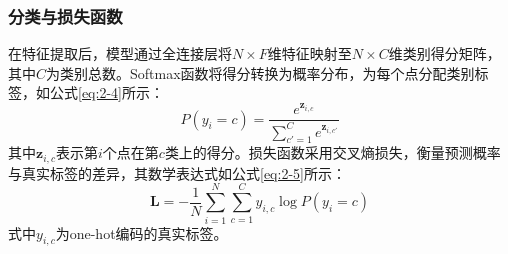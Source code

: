 \subsubsection{分类与损失函数}
在特征提取后，模型通过全连接层将$N \times F$维特征映射至$N \times C$维类别得分矩阵，其中$C$为类别总数。Softmax函数将得分转换为概率分布，为每个点分配类别标签，如公式\eqref{eq:2-4}所示：
\begin{equation}
    \label{eq:2-4}
    P(y_i=c) = \frac{e^{\mathbf{z}_{i,c}}}{\sum_{c'=1}^C e^{\mathbf{z}_{i,c'}}}
\end{equation}
其中$\mathbf{z}_{i,c}$表示第$i$个点在第$c$类上的得分。损失函数采用交叉熵损失，衡量预测概率与真实标签的差异，其数学表达式如公式\eqref{eq:2-5}所示：
\begin{equation}
    \label{eq:2-5}
    \mathbf{L} = -\frac{1}{N} \sum_{i=1}^N \sum_{c=1}^C y_{i,c} \log P(y_i=c)
\end{equation}
式中$y_{i,c}$为one-hot编码的真实标签。%



